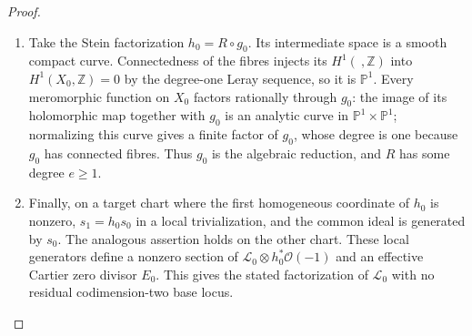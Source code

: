 \begin{proof}
\begin{enumerate}[label={$\langle1\rangle$\arabic*.},leftmargin=*]
\item Take the Stein factorization $h_0=R\circ g_0$.  Its intermediate
space is a smooth compact curve.  Connectedness of the fibres
injects its $H^1(\ ,\mathbb Z)$ into $H^1(X_0,\mathbb Z)=0$
by the degree-one Leray sequence, so it is $\mathbb P^1$.
Every meromorphic function on $X_0$ factors rationally through
$g_0$: the image of its holomorphic map together with $g_0$
is an analytic curve in $\mathbb P^1\times\mathbb P^1$;
normalizing this curve gives a finite factor of $g_0$, whose
degree is one because $g_0$ has connected fibres.  Thus $g_0$
is the algebraic reduction, and $R$ has some degree $e\ge1$.

\item Finally, on a target chart where the first homogeneous
coordinate of $h_0$ is nonzero, $s_1=h_0s_0$ in a local
trivialization, and the common ideal is generated by $s_0$.
The analogous assertion holds on the other chart.  These local
generators define a nonzero section of
$\mathcal L_0\otimes h_0^*\mathcal O(-1)$ and an effective
Cartier zero divisor $E_0$.  This gives the stated factorization
of $\mathcal L_0$ with no residual codimension-two base locus.

\end{enumerate}
\end{proof}

